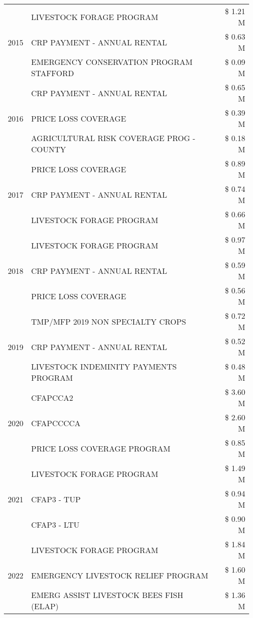 \begin{tabular}{llr}
\cline{1-3}
\multirow[t]{3}{*}{2015} & LIVESTOCK FORAGE PROGRAM & \$ 1.21 M \\
 & CRP PAYMENT - ANNUAL RENTAL & \$ 0.63 M \\
 & EMERGENCY CONSERVATION PROGRAM STAFFORD & \$ 0.09 M \\
\cline{1-3}
\multirow[t]{3}{*}{2016} & CRP PAYMENT - ANNUAL RENTAL & \$ 0.65 M \\
 & PRICE LOSS COVERAGE & \$ 0.39 M \\
 & AGRICULTURAL RISK COVERAGE PROG - COUNTY & \$ 0.18 M \\
\cline{1-3}
\multirow[t]{3}{*}{2017} & PRICE LOSS COVERAGE & \$ 0.89 M \\
 & CRP PAYMENT - ANNUAL RENTAL & \$ 0.74 M \\
 & LIVESTOCK FORAGE PROGRAM & \$ 0.66 M \\
\cline{1-3}
\multirow[t]{3}{*}{2018} & LIVESTOCK FORAGE PROGRAM & \$ 0.97 M \\
 & CRP PAYMENT - ANNUAL RENTAL & \$ 0.59 M \\
 & PRICE LOSS COVERAGE & \$ 0.56 M \\
\cline{1-3}
\multirow[t]{3}{*}{2019} & TMP/MFP 2019 NON SPECIALTY CROPS & \$ 0.72 M \\
 & CRP PAYMENT - ANNUAL RENTAL & \$ 0.52 M \\
 & LIVESTOCK INDEMINITY PAYMENTS PROGRAM & \$ 0.48 M \\
\cline{1-3}
\multirow[t]{3}{*}{2020} & CFAPCCA2 & \$ 3.60 M \\
 & CFAPCCCCA & \$ 2.60 M \\
 & PRICE LOSS COVERAGE PROGRAM & \$ 0.85 M \\
\cline{1-3}
\multirow[t]{3}{*}{2021} & LIVESTOCK FORAGE PROGRAM & \$ 1.49 M \\
 & CFAP3 - TUP & \$ 0.94 M \\
 & CFAP3 - LTU & \$ 0.90 M \\
\cline{1-3}
\multirow[t]{3}{*}{2022} & LIVESTOCK FORAGE PROGRAM & \$ 1.84 M \\
 & EMERGENCY LIVESTOCK RELIEF PROGRAM & \$ 1.60 M \\
 & EMERG ASSIST LIVESTOCK BEES FISH (ELAP) & \$ 1.36 M \\
\cline{1-3}
\bottomrule
\end{tabular}
